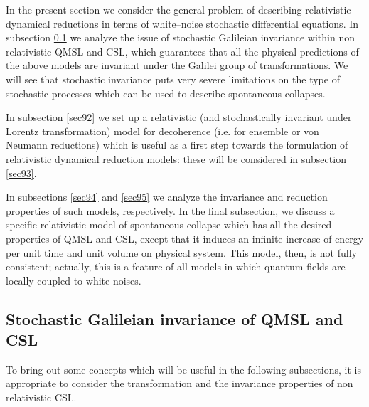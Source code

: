 \documentclass[10pt,a4paper]{article}
\begin{document}
In the present section we consider the general problem of
describing relativistic dynamical reductions in terms of
white--noise stochastic differential equations. In subsection
\ref{sec91} we analyze the issue of stochastic Galileian
invariance within non relativistic QMSL and CSL, which guarantees
that all the physical predictions of the above models are
invariant under the Galilei group of transformations. We will see
that stochastic invariance puts very severe limitations on the
type of stochastic processes which can be used to describe
spontaneous collapses.

In subsection \ref{sec92} we set up a relativistic (and
stochastically invariant under Lorentz transformation) model for
decoherence (i.e. for ensemble or von Neumann reductions) which is
useful as a first step towards the formulation of relativistic
dynamical reduction models: these will be considered in subsection
\ref{sec93}.

In subsections \ref{sec94} and \ref{sec95} we analyze the
invariance and reduction properties of such models, respectively.
In the final subsection, we discuss a specific relativistic model
of spontaneous collapse which has all the desired properties of
QMSL and CSL, except that it induces an infinite increase of
energy per unit time and unit volume on physical system. This
model, then, is not fully consistent; actually, this is a feature
of all models in which quantum fields are locally coupled to white
noises.



\subsection{Stochastic Galileian invariance of QMSL and CSL}
\label{sec91}

To bring out some concepts which will be useful in the following
subsections, it is appropriate to consider the transformation and
the invariance properties of non relativistic CSL.
\end{document}
